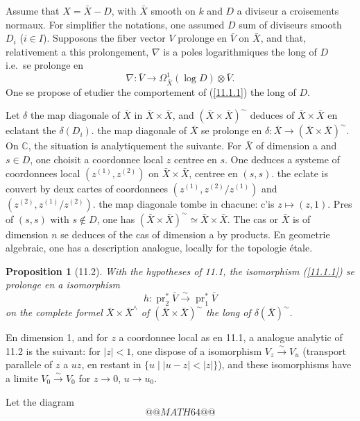 \documentclass[12pt,a4paper]{article}
\theoremstyle{plain}
\newtheorem{proposition}[theorem]{Proposition}
\theoremstyle{definition}
\theoremstyle{remark}
\DeclareMathOperator{\pr}{pr}
\newcommand{\C}{\mathbb{C}}
\begin{document}
Assume that $X = \bar{X} - D$, with $\bar{X}$ smooth on $k$ and $D$ a diviseur a croisements normaux. For simplifier the notations, one assumed $D$ sum of diviseurs smooth $D_i$ ($i \in I$). Supposons the fiber vector $V$ prolonge en $\bar{V}$ on $\bar{X}$, and that, relativement a this prolongement, $\nabla$ is a poles logarithmiques the long of $D$ i.e.~se prolonge en
$$\nabla: \bar{V} \longrightarrow \Omega^1_{\bar{X}}(\log D) \otimes \bar{V}.$$
One se propose of etudier the comportement of (\ref{11.1.1}) the long of $D$.

Let $\delta$ the map diagonale of $\bar{X}$ in $\bar{X} \times \bar{X}$, and $(\bar{X} \times \bar{X})^\sim$ deduces of $\bar{X} \times \bar{X}$ en eclatant the $\delta(D_i)$. the map diagonale of $\bar{X}$ se prolonge en $\delta: \bar{X} \to (\bar{X} \times \bar{X})^\sim$. On $\C$, the situation is analytiquement the suivante. For $\bar{X}$ of dimension a and $s \in D$, one choisit a coordonnee local $z$ centree en $s$. One deduces a systeme of coordonnees local $(z^{(1)}, z^{(2)})$ on $\bar{X} \times \bar{X}$, centree en $(s, s)$. the eclate is couvert by deux cartes of coordonnees $(z^{(1)}, z^{(2)}/z^{(1)})$ and $(z^{(2)}, z^{(1)}/z^{(2)})$. the map diagonale tombe in chacune: c'is $z \mapsto (z, 1)$. Pres of $(s, s)$ with $s \notin D$, one has $(\bar{X} \times \bar{X})^\sim \simeq \bar{X} \times \bar{X}$. The cas or $\bar{X}$ is of dimension $n$ se deduces of the cas of dimension a by products. En geometrie algebraic, one has a description analogue, locally for the topologie étale.

\begin{proposition}[11.2]
With the hypotheses of 11.1, the isomorphism (\ref{11.1.1}) se prolonge en a isomorphism
\begin{equation}\label{11.2.1}
h: \pr_2^* \bar{V} \xrightarrow{\sim} \pr_1^* \bar{V} \tag{11.2.1}
\end{equation}
on the complete formel $\bar{X} \times \bar{X}^{\wedge}$ of $(\bar{X} \times \bar{X})^\sim$ the long of $\delta(\bar{X})^\sim$.
\end{proposition}

En dimension 1, and for $z$ a coordonnee local as en 11.1, a analogue analytic of 11.2 is the suivant: for $|z| < 1$, one dispose of a isomorphism $V_z \xrightarrow{\sim} V_u$ (transport parallele of $z$ a $uz$, en restant in $\{u \mid |u-z| < |z|\}$), and these isomorphisms have a limite $V_0 \xrightarrow{\sim} V_0$ for $z \to 0$, $u \to u_0$.

Let the diagram
$$@@MATH64@@$$
\end{document}
